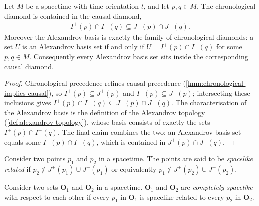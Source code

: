 \begin{theorem}
    \label{thrm:causal-diamond-vs-chronological}
    \leanok
    Let $M$ be a spacetime with time orientation $t$, and let $p, q \in M$. The chronological diamond is contained in the causal diamond,
    \begin{align}
        I^+(p) \cap I^-(q) \subseteq J^+(p) \cap J^-(q).
    \end{align}
    Moreover the Alexandrov basis is exactly the family of chronological diamonds: a set $U$ is an Alexandrov basis set if and only if $U = I^+(p) \cap I^-(q)$ for some $p, q \in M$. Consequently every Alexandrov basis set sits inside the corresponding causal diamond.
\end{theorem}
\begin{proof}
    \leanok
    Chronological precedence refines causal precedence (\ref{lmm:chronological-implies-causal}), so $I^+(p) \subseteq J^+(p)$ and $I^-(p) \subseteq J^-(p)$; intersecting these inclusions gives $I^+(p) \cap I^-(q) \subseteq J^+(p) \cap J^-(q)$. The characterisation of the Alexandrov basis is the definition of the Alexandrov topology (\ref{def:alexandrov-topology}), whose basis consists of exactly the sets $I^+(p) \cap I^-(q)$. The final claim combines the two: an Alexandrov basis set equals some $I^+(p) \cap I^-(q)$, which is contained in $J^+(p) \cap J^-(q)$.
\end{proof}

\begin{definition}
    \label{def:spacelike-related}
    \leanok
    Consider two points $p_1$ and $p_2$ in a spacetime. The points are said to be \textit{spacelike related} if $p_2 \notin J^+(p_1) \cup J^-(p_1)$ or equivalently $p_1 \notin J^+(p_2) \cup J^-(p_2)$.
\end{definition}

\begin{definition}
    \label{def:completely-spacelike}
    \leanok
    Consider two sets $\mathbf{O}_1$ and $\mathbf{O}_2$ in a spacetime. $\mathbf{O}_1$ and $\mathbf{O}_2$ are \textit{completely spacelike}  with respect to each other if every $p_1$ in $\mathbf{O}_1$ is spacelike related to every $p_2$ in $\mathbf{O}_2$.
\end{definition}

